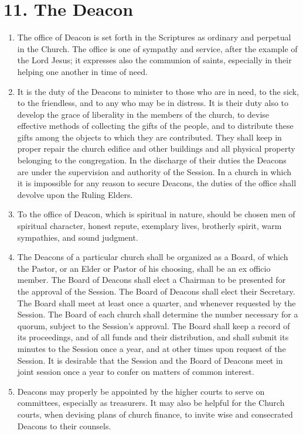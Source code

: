 \documentclass[
]{book}
\providecommand{\tightlist}{%
  \setlength{\itemsep}{0pt}\setlength{\parskip}{0pt}}
\begin{document}
\hypertarget{the-deacon}{%
\section*{11. The Deacon}\label{the-deacon}}

\protect\hypertarget{chapter-slug-11-the-deacon}{\href{}{}}

\begin{enumerate}
\def\labelenumi{\arabic{enumi}.}
\tightlist
\item
  \protect\hypertarget{11}{\href{}{}}The office of Deacon is set forth in the Scriptures as ordinary and perpetual in the Church. The office is one of sympathy and service, after the example of the Lord Jesus; it expresses also the communion of saints, especially in their helping one another in time of need.
\item
  It is the duty of the Deacons to minister to those who are in need, to the sick, to the friendless, and to any who may be in distress. It is their duty also to develop the grace of liberality in the members of the church, to devise effective methods of collecting the gifts of the people, and to distribute these gifts among the objects to which they are contributed. They shall keep in proper repair the church edifice and other buildings and all physical property belonging to the congregation. In the discharge of their duties the Deacons are under the supervision and authority of the Session. In a church in which it is impossible for any reason to secure Deacons, the duties of the office shall devolve upon the Ruling Elders.
\item
  To the office of Deacon, which is spiritual in nature, should be chosen men of spiritual character, honest repute, exemplary lives, brotherly spirit, warm sympathies, and sound judgment.
\item
  The Deacons of a particular church shall be organized as a Board, of which the Pastor, or an Elder or Pastor of his choosing, shall be an ex officio member. The Board of Deacons shall elect a Chairman to be presented for the approval of the Session. The Board of Deacons shall elect their Secretary. The Board shall meet at least once a quarter, and whenever requested by the Session. The Board of each church shall determine the number necessary for a quorum, subject to the Session's approval. The Board shall keep a record of its proceedings, and of all funds and their distribution, and shall submit its minutes to the Session once a year, and at other times upon request of the Session. It is desirable that the Session and the Board of Deacons meet in joint session once a year to confer on matters of common interest.
\item
  Deacons may properly be appointed by the higher courts to serve on committees, especially as treasurers. It may also be helpful for the Church courts, when devising plans of church finance, to invite wise and consecrated Deacons to their counsels.
\end{enumerate}
\end{document}
